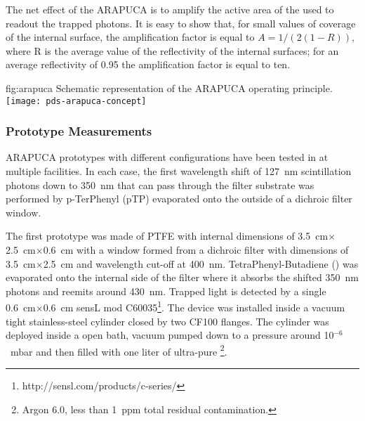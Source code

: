The net effect of the ARAPUCA is to amplify the active area of the  used to readout the trapped photons. It is easy to show that, for small values of  coverage of the internal surface, the amplification factor is equal to $A=1/(2(1-R))$,
where R is the average value of the reflectivity of the internal surfaces; for an average reflectivity of 0.95 the amplification factor is equal to ten.

\begin{dunefigure}{fig:arapuca}
{Schematic representation of the ARAPUCA operating principle.}
  \texttt{[image: pds-arapuca-concept]}   
\end{dunefigure}


\subsubsection{Prototype Measurements}
\label{subsec:testlnls}

ARAPUCA prototypes with different configurations have been tested in \lar at multiple facilities. In each case, the first wavelength shift of \SI{127}{nm} scintillation photons down to \SI{350}{nm} that can pass through the filter substrate was performed by p-TerPhenyl (pTP) evaporated onto the outside of a dichroic filter window. 

The first prototype was made of PTFE with internal dimensions of \SI{3.5}{cm}$\times$\SI{2.5}{cm}$\times$\SI{0.6}{cm} with a window formed from a dichroic filter with dimensions of \SI{3.5}{cm}$\times$\SI{2.5}{cm} and wavelength cut-off at \SI{400}{nm}. 
TetraPhenyl-Butadiene () was evaporated onto the internal side of the filter where it absorbs the shifted \SI{350}{nm} photons and reemits around \SI{430}{nm}. Trapped light is detected by a single \SI{0.6}{cm}$\times$\SI{0.6}{cm} sensL  mod C60035\footnote{http://sensl.com/products/c-series/}.
The device was installed inside a vacuum tight stainless-steel cylinder closed by two CF100 flanges. The cylinder was deployed inside a \lar open bath, vacuum pumped down to a pressure around  10$^{-6}$~\si{mbar} and then filled with one liter of ultra-pure \lar\footnote{Argon 6.0, less than \SI{1}{ppm} total residual contamination.}.

